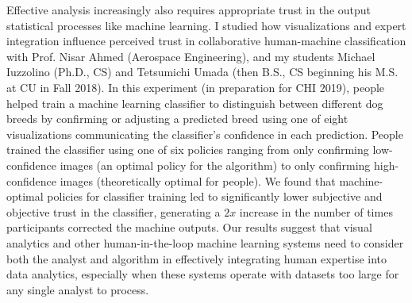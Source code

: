 \documentclass[11pt]{article}
\begin{document}
Effective analysis increasingly also requires appropriate trust in the output statistical processes like machine learning. 
I studied how visualizations and expert integration influence perceived trust in collaborative human-machine classification with Prof. Nisar Ahmed (Aerospace Engineering), and my students Michael Iuzzolino (Ph.D., CS) and Tetsumichi Umada (then B.S., CS beginning his M.S. at CU in Fall 2018). In this experiment (in preparation for CHI 2019), people helped train a machine learning classifier to distinguish between different dog breeds by confirming or adjusting a predicted breed using one of eight visualizations communicating the classifier's confidence in each prediction. 
People trained the classifier using one of six policies ranging from only confirming low-confidence images (an optimal policy for the algorithm) to only confirming high-confidence images (theoretically optimal for people). We found that machine-optimal policies for classifier training led to significantly lower subjective and objective trust in the classifier, generating a $2x$ increase in the number of times participants corrected the machine outputs.  Our results suggest that visual analytics and other human-in-the-loop machine learning systems need to consider both the analyst and algorithm in effectively integrating human expertise into data analytics, especially when these systems operate with datasets too large for any single analyst to process. 


\end{document}

